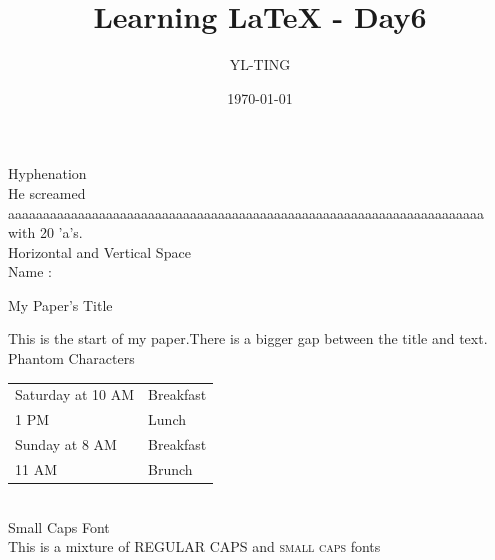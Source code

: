 \documentclass{article}
\author{YL-TING}
\title{Learning LaTeX - Day6}
\date{\today}
\begin{document}
    \maketitle
    \newpage



    {\Large Hyphenation}\\
    {\Large He screamed aaaaaaaaaaaaaaaaaaaaaaaaaaaaaaaaaaaaaaaaaaaaaaaaaaaaaaaa\-aaaaaaaaaaaa with 20 'a's.}\\[15pt]

    {\Large Horizontal and Vertical Space}\\
    Name : \underline{\hspace{6cm}}\\[15pt]

    \begin{center}
        \LARGE My Paper's Title
    \end{center}
    \vspace{1cm}
    This is the start of my paper.There is a bigger gap between the title and text.\\[15pt]

    {\Large Phantom Characters}\\[15pt]
    \begin{tabular}{ll}
        Saturday at 10 AM & Breakfast \\
        \phantom{Saturday at} 1 PM & Lunch \\
        Sunday at 8 AM & Breakfast \\
        \phantom{Sunday at} 11 AM & Brunch 
    \end{tabular}\\[15pt]

    {\Large Small Caps Font}\\[15pt]
    This is a mixture of REGULAR CAPS and \textsc{small caps} fonts\\[15pt]
    
\end{document}
